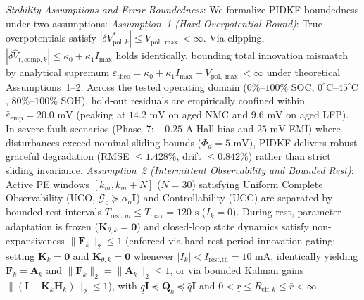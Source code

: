 \documentclass[preprint,12pt]{elsarticle}
\begin{document}
\emph{Stability Assumptions and Error Boundedness}: We formalize PIDKF boundedness under two assumptions:
\emph{Assumption~1 (Hard Overpotential Bound)}: True overpotentials satisfy $|\delta V_{\text{pol},k}^*| \le V_{\text{pol},\max} < \infty$. Via clipping, $|\delta \hat{V}_{t,\text{comp},k}| \le \kappa_0 + \kappa_1 I_{\max}$ holds identically, bounding total innovation mismatch by analytical supremum $\bar{\varepsilon}_{\text{theo}} = \kappa_0 + \kappa_1 I_{\max} + V_{\text{pol},\max} < \infty$ under theoretical Assumptions~1--2. Across the tested operating domain ($0\%\text{--}100\%$ SOC, $0^\circ\text{C}\text{--}45^\circ\text{C}$, $80\%\text{--}100\%$ SOH), hold-out residuals are empirically confined within $\bar{\varepsilon}_{\text{emp}} = 20.0\text{ mV}$ (peaking at $14.2\text{ mV}$ on aged NMC and $9.6\text{ mV}$ on aged LFP). In severe fault scenarios (Phase~7: $+0.25\text{ A}$ Hall bias and $25\text{ mV}$ EMI) where disturbances exceed nominal sliding bounds ($\Phi_d = 5\text{ mV}$), PIDKF delivers robust graceful degradation (RMSE $\le 1.428\%$, drift $\le 0.842\%$) rather than strict sliding invariance.
\emph{Assumption~2 (Intermittent Observability and Bounded Rest)}: Active PE windows $[k_m, k_m+N]$ ($N=30$) satisfying Uniform Complete Observability (UCO, $\mathcal{G}_o \succeq \alpha_o \mathbf{I}$) and Controllability (UCC) are separated by bounded rest intervals $T_{\text{rest},m} \le T_{\max} = 120\text{ s}$ ($I_k = 0$). During rest, parameter adaptation is frozen ($\mathbf{K}_{\theta,k} = \mathbf{0}$) and closed-loop state dynamics satisfy non-expansiveness $\|\mathbf{F}_k\|_2 \le 1$ (enforced via hard rest-period innovation gating: setting $\mathbf{K}_k = \mathbf{0}$ and $\mathbf{K}_{\theta,k} = \mathbf{0}$ whenever $|I_k| < I_{\text{rest,th}} = 10\text{ mA}$, identically yielding $\mathbf{F}_k = \mathbf{A}_k$ and $\|\mathbf{F}_k\|_2 = \|\mathbf{A}_k\|_2 \le 1$, or via bounded Kalman gains $\|(\mathbf{I} - \mathbf{K}_k\mathbf{H}_k)\|_2 \le 1$), with $\underline{q}\mathbf{I} \preceq \mathbf{Q}_k \preceq \bar{q}\mathbf{I}$ and $0 < \underline{r} \le R_{\text{eff},k} \le \bar{r} < \infty$.
\end{document}
